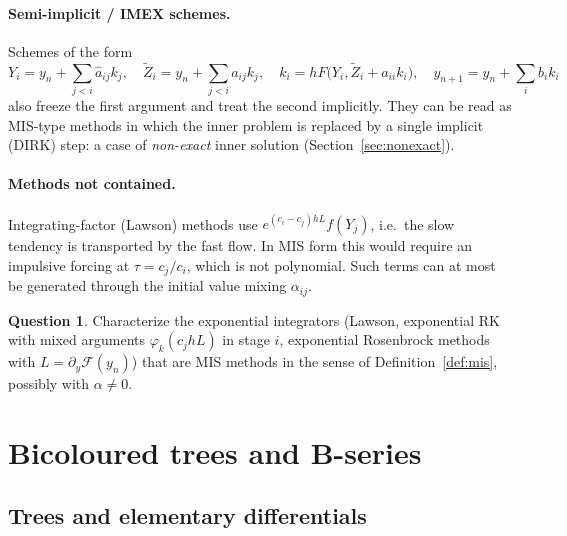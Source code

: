 \documentclass[11pt,a4paper]{article}
\theoremstyle{definition}
\newtheorem{question}{Question}
\theoremstyle{remark}
\begin{document}
\paragraph{Semi-implicit / IMEX schemes.}
Schemes of the form \cite{BoscarinoFilbetRusso2016}
\begin{equation*}
 Y_i=y_n+\sum_{j<i}\hat a_{ij}k_j,\quad \tilde Z_i=y_n+\sum_{j<i}a_{ij}k_j,\quad
 k_i=hF\big(Y_i,\tilde Z_i+a_{ii}k_i\big),\quad y_{n+1}=y_n+\sum_ib_ik_i
\end{equation*}
also freeze the first argument and treat the second implicitly. They can
be read as MIS-type methods in which the inner problem is replaced by a
single implicit (DIRK) step: a case of \emph{non-exact} inner solution
(Section~\ref{sec:nonexact}).

\paragraph{Methods not contained.}
Integrating-factor (Lawson) methods \cite{Lawson1967} use
$e^{(c_i-c_j)hL}f(Y_j)$, i.e.\ the slow tendency is transported by the
fast flow. In MIS form this would require an impulsive forcing at
$\tau=c_j/c_i$, which is not polynomial. Such terms can at most be
generated through the initial value mixing $\alpha_{ij}$.

\begin{question}
Characterize the exponential integrators (Lawson, exponential RK with
mixed arguments $\varphi_k(c_jhL)$ in stage $i$, exponential Rosenbrock
methods \cite{HochbruckOstermannSchweitzer2009} with $L=\partial_y\mathcal
F(y_n)$) that are MIS methods in the sense of Definition~\ref{def:mis},
possibly with $\alpha\neq0$.
\end{question}

\section{Bicoloured trees and B-series}
\label{sec:trees}

\subsection{Trees and elementary differentials}
\end{document}
